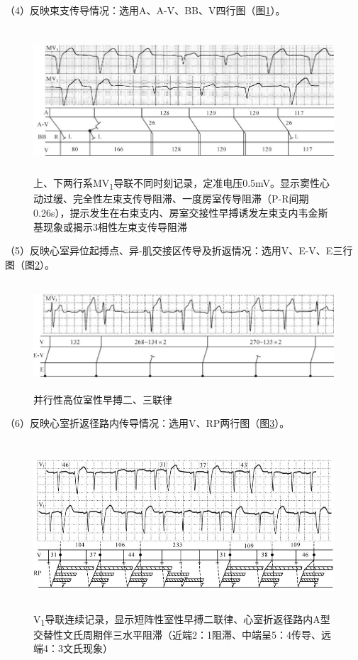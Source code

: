 （4）反映束支传导情况：选用A、A-V、BB、V四行图（图\ref{fig10-4}）。

\begin{figure}[!htbp]
 \centering
 \includegraphics[width=5.82292in,height=2.13542in]{./images/Image00148.jpg}
 \captionsetup{justification=centering}
 \caption{上、下两行系MV\textsubscript{1}导联不同时刻记录，定准电压0.5mV。显示窦性心动过缓、完全性左束支传导阻滞、一度房室传导阻滞（P-R间期0.26s），提示发生在右束支内、房室交接性早搏诱发左束支内韦金斯基现象或揭示3相性左束支传导阻滞}
 \label{fig10-4}
  \end{figure} 


（5）反映心室异位起搏点、异-肌交接区传导及折返情况：选用V、E-V、E三行图（图\ref{fig10-5}）。

\begin{figure}[!htbp]
 \centering
 \includegraphics[width=5.77083in,height=1.58333in]{./images/Image00149.jpg}
 \captionsetup{justification=centering}
 \caption{并行性高位室性早搏二、三联律}
 \label{fig10-5}
  \end{figure} 

（6）反映心室折返径路内传导情况：选用V、RP两行图（图\ref{fig10-6}）。

\begin{figure}[!htbp]
 \centering
 \includegraphics[width=5.70833in,height=2.46875in]{./images/Image00150.jpg}
 \captionsetup{justification=centering}
 \caption{V\textsubscript{1}导联连续记录，显示短阵性室性早搏二联律、心室折返径路内A型交替性文氏周期伴三水平阻滞（近端2：1阻滞、中端呈5：4传导、远端4：3文氏现象）}
 \label{fig10-6}
  \end{figure} 


